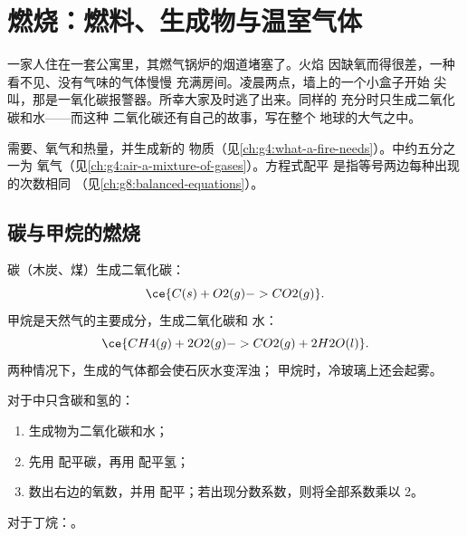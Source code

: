 \chapter{燃烧：燃料、生成物与温室气体}\label{ch:g8:combustion-and-fuels}

一家人住在一套公寓里，其燃气锅炉的烟道堵塞了。火焰
因缺氧而得很差，一种看不见、没有气味的气体慢慢
充满房间。凌晨两点，墙上的一个小盒子开始
尖叫，那是一氧化碳报警器。所幸大家及时逃了出来。同样的
充分时只生成二氧化碳和水——而这种
二氧化碳还有自己的故事，写在整个
地球的大气之中。

\begin{recall}
需要、氧气和热量，并生成新的
物质（见\cref{ch:g4:what-a-fire-needs}）。中约五分之一为
氧气（见\cref{ch:g4:air-a-mixture-of-gases}）。方程式配平
是指等号两边每种出现的次数相同
（见\cref{ch:g8:balanced-equations}）。
\end{recall}

\section{碳与甲烷的燃烧}

\begin{example}[两种燃烧]\label{ex:g8:combustion-and-fuels:two}
碳（木炭、煤）生成二氧化碳：
\[
  \ce{C(s) + O2(g) -> CO2(g)}.
\]
甲烷是天然气的主要成分，生成二氧化碳和
水：
\[
  \ce{CH4(g) + 2O2(g) -> CO2(g) + 2H2O(l)}.
\]
两种情况下，生成的气体都会使石灰水变浑浊；
甲烷时，冷玻璃上还会起雾。
\end{example}

\begin{method}\label{met:g8:combustion-and-fuels:write}
对于中只含碳和氢的：
\begin{enumerate}
  \item 生成物为二氧化碳和水；
  \item 先用  配平碳，再用  配平氢；
       \item 数出右边的氧数，并用
         配平；若出现分数系数，则将全部系数乘以 2。
\end{enumerate}
对于丁烷：。
\end{method}

